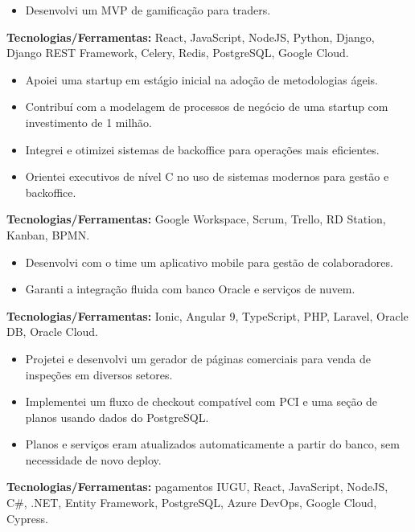 \documentclass[10pt,a4paper]{altacv}
\begin{document}
\break
{}

\begin{itemize}
    \setlength{\itemindent}{0.5em}
    \item[--] Desenvolvi um MVP de gamificação para traders.
\end{itemize}
\textbf{Tecnologias/Ferramentas:} React, JavaScript, NodeJS, Python, Django, Django REST Framework, Celery, Redis, PostgreSQL, Google Cloud.
\vspace{5mm}

\begin{itemize}
    \setlength{\itemindent}{0.5em}
    \item[--] Apoiei uma startup em estágio inicial na adoção de metodologias ágeis.
    \item[--] Contribuí com a modelagem de processos de negócio de uma startup com investimento de 1 milhão.
    \item[--] Integrei e otimizei sistemas de backoffice para operações mais eficientes.
    \item[--] Orientei executivos de nível C no uso de sistemas modernos para gestão e backoffice.
\end{itemize}
\textbf{Tecnologias/Ferramentas:} Google Workspace, Scrum, Trello, RD Station, Kanban, BPMN.
\vspace{5mm}

\begin{itemize}
    \setlength{\itemindent}{0.5em}
    \item[--] Desenvolvi com o time um aplicativo mobile para gestão de colaboradores.
    \item[--] Garanti a integração fluida com banco Oracle e serviços de nuvem.
\end{itemize}
\textbf{Tecnologias/Ferramentas:} Ionic, Angular 9, TypeScript, PHP, Laravel, Oracle DB, Oracle Cloud.
\vspace{5mm}

\begin{itemize}
    \setlength{\itemindent}{0.5em}
    \item[--] Projetei e desenvolvi um gerador de páginas comerciais para venda de inspeções em diversos setores.
    \item[--] Implementei um fluxo de checkout compatível com PCI e uma seção de planos usando dados do PostgreSQL.
    \item[--] Planos e serviços eram atualizados automaticamente a partir do banco, sem necessidade de novo deploy.
\end{itemize}
\textbf{Tecnologias/Ferramentas:} pagamentos IUGU, React, JavaScript, NodeJS, C\#, .NET, Entity Framework, PostgreSQL, Azure DevOps, Google Cloud, Cypress.
\end{document}
